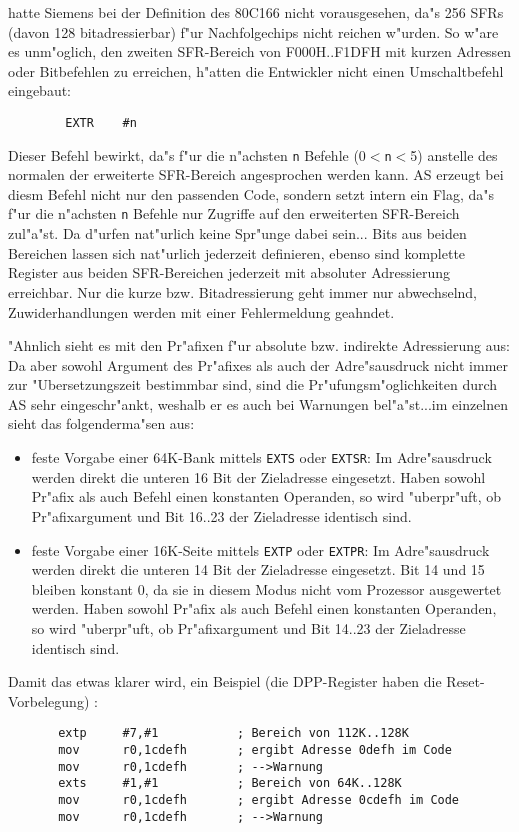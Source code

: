 \documentclass[12pt,a4paper,twoside]{report}
\newcommand{\tty}[1]{{\tt #1}}
\begin{document}
{hatte Siemens bei der Definition des 80C166 nicht vorausgesehen, da"s
256 SFRs (davon 128 bitadressierbar) f"ur Nachfolgechips nicht reichen
w"urden. So w"are es unm"oglich, den zweiten SFR-Bereich von F000H..F1DFH
mit kurzen Adressen oder Bitbefehlen zu erreichen, h"atten die Entwickler
nicht einen Umschaltbefehl eingebaut:
\begin{verbatim}
        EXTR    #n
\end{verbatim}
Dieser Befehl bewirkt, da"s f"ur die n"achsten \tty{n} Befehle (0$<$\tty{n}$<$5)
anstelle des normalen der erweiterte SFR-Bereich angesprochen werden kann.
AS erzeugt bei diesm Befehl nicht nur den passenden Code, sondern setzt
intern ein Flag, da"s f"ur die n"achsten \tty{n} Befehle nur Zugriffe auf den
erweiterten SFR-Bereich zul"a"st.  Da d"urfen nat"urlich keine Spr"unge
dabei sein... Bits aus beiden Bereichen lassen sich nat"urlich jederzeit
definieren, ebenso sind komplette Register aus beiden SFR-Bereichen
jederzeit mit absoluter Adressierung erreichbar.  Nur die kurze bzw.
Bitadressierung geht immer nur abwechselnd, Zuwiderhandlungen werden
mit einer Fehlermeldung geahndet.
\par
"Ahnlich sieht es mit den Pr"afixen f"ur absolute bzw. indirekte
Adressierung aus: Da aber sowohl Argument des Pr"afixes als auch der
Adre"sausdruck nicht immer zur "Ubersetzungszeit bestimmbar sind, sind
die Pr"ufungsm"oglichkeiten durch AS sehr eingeschr"ankt, weshalb er es
auch bei Warnungen bel"a"st...im einzelnen sieht das folgenderma"sen aus:
\begin{itemize}
\item{feste Vorgabe einer 64K-Bank mittels \tty{EXTS} oder \tty{EXTSR}:
      Im Adre"sausdruck werden direkt die unteren 16 Bit der Zieladresse
      eingesetzt.  Haben sowohl Pr"afix als auch Befehl einen konstanten
      Operanden, so wird "uberpr"uft, ob Pr"afixargument und Bit 16..23 der
      Zieladresse identisch sind.}
\item{feste Vorgabe einer 16K-Seite mittels \tty{EXTP} oder \tty{EXTPR}:
      Im Adre"sausdruck werden direkt die unteren 14 Bit der Zieladresse
      eingesetzt.  Bit 14 und 15 bleiben konstant 0, da sie in diesem Modus
      nicht vom Prozessor ausgewertet werden.  Haben sowohl Pr"afix als
      auch Befehl einen konstanten Operanden, so wird "uberpr"uft, ob
      Pr"afixargument und Bit 14..23 der Zieladresse identisch sind.}
\end{itemize}
Damit das etwas klarer wird, ein Beispiel (die DPP-Register haben
die Reset-Vorbelegung) :
\begin{verbatim}
       extp     #7,#1           ; Bereich von 112K..128K
       mov      r0,1cdefh       ; ergibt Adresse 0defh im Code
       mov      r0,1cdefh       ; -->Warnung
       exts     #1,#1           ; Bereich von 64K..128K
       mov      r0,1cdefh       ; ergibt Adresse 0cdefh im Code
       mov      r0,1cdefh       ; -->Warnung
\end{verbatim}

}
\end{document}
